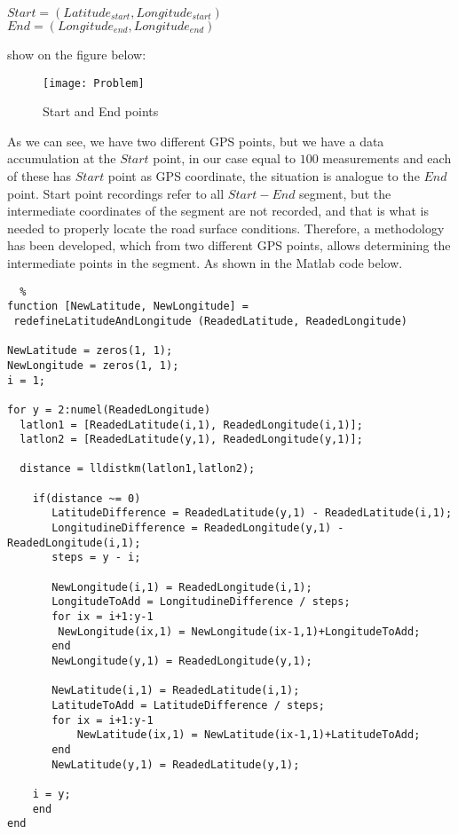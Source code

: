 \documentclass[tesi]{subfiles}
\begin{document}
\begin{center}
 $Start = (Latitude_{start}, Longitude_{start})$\\
 $End = (Longitude_{end}, Longitude_{end})$
\end{center}

show on the figure below:
\begin{figure}[H]	
\centering
\texttt{[image: Problem]} \label{GPS Points Problem}
 \caption{Start and End points}
  \label{fig:GPS Points Problem}
\end{figure}


As we can see, we have two different GPS points, but we have a data accumulation at the $Start$ point, in our case equal to $100$ measurements and each of these has $Start$ point as GPS coordinate, the situation is analogue to the $End$ point.
Start point recordings refer to all $Start-End$ segment, but the intermediate coordinates of the segment are not recorded, and that is what is needed to properly locate the road surface conditions.
Therefore, a methodology has been developed, which from two different GPS points, allows determining the intermediate points in the segment. As shown in the Matlab code below.
\vspace{0.1cm}
\label{alg:Redefine Latitude And Longitude}
\lstset{language=Matlab}          %
\begin{lstlisting}  % 
function [NewLatitude, NewLongitude] =
 redefineLatitudeAndLongitude (ReadedLatitude, ReadedLongitude)

NewLatitude = zeros(1, 1);
NewLongitude = zeros(1, 1);
i = 1;
    
for y = 2:numel(ReadedLongitude)    
  latlon1 = [ReadedLatitude(i,1), ReadedLongitude(i,1)];
  latlon2 = [ReadedLatitude(y,1), ReadedLongitude(y,1)];
  
  distance = lldistkm(latlon1,latlon2);   

    if(distance ~= 0)    
       LatitudeDifference = ReadedLatitude(y,1) - ReadedLatitude(i,1);
       LongitudineDifference = ReadedLongitude(y,1) - ReadedLongitude(i,1);
       steps = y - i;
   
       NewLongitude(i,1) = ReadedLongitude(i,1);
       LongitudeToAdd = LongitudineDifference / steps;
       for ix = i+1:y-1
        NewLongitude(ix,1) = NewLongitude(ix-1,1)+LongitudeToAdd;
       end       
       NewLongitude(y,1) = ReadedLongitude(y,1);
       
       NewLatitude(i,1) = ReadedLatitude(i,1);
       LatitudeToAdd = LatitudeDifference / steps;
       for ix = i+1:y-1
           NewLatitude(ix,1) = NewLatitude(ix-1,1)+LatitudeToAdd;
       end
       NewLatitude(y,1) = ReadedLatitude(y,1);   
    
    i = y;
    end
end 
\end{lstlisting}
\end{document}
